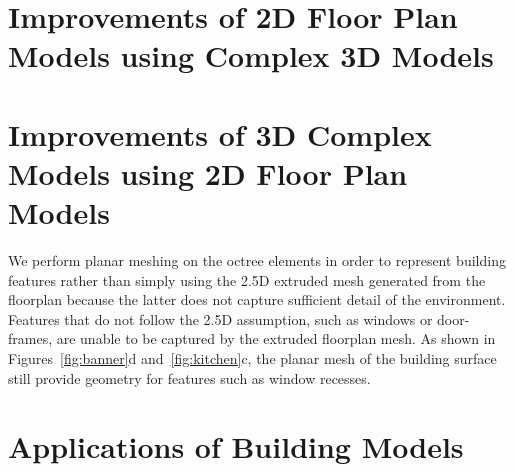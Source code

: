 \documentclass[12pt,onecolumn,oneside]{book}
\begin{document}
\chapter{Improvements of 2D Floor Plan Models using Complex 3D Models}
\label{ch:better_floorplans}





\chapter{Improvements of 3D Complex Models using 2D Floor Plan Models}
\label{ch:better_carving}





We perform planar meshing on the octree elements in order to represent building features rather than simply using the 2.5D extruded mesh generated from the floorplan because the latter does not capture sufficient detail of the environment.  Features that do not follow the 2.5D assumption, such as windows or door-frames, are unable to be captured by the extruded floorplan mesh.  As shown in Figures~\ref{fig:banner}d and~\ref{fig:kitchen}c, the planar mesh of the building surface still provide geometry for features such as window recesses.



\chapter{Applications of Building Models}
\label{ch:applications}
\end{document}
